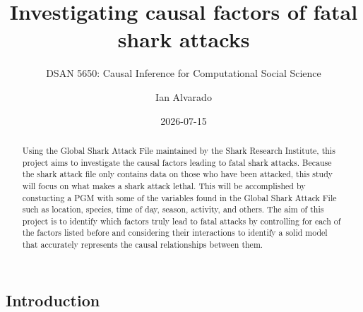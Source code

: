 \documentclass[
  letterpaper,
  DIV=11,
  numbers=noendperiod]{scrartcl}
\title{Investigating causal factors of fatal shark attacks}
\subtitle{DSAN 5650: Causal Inference for Computational Social Science}
\author{Ian Alvarado}
\date{2026-07-15}
\begin{document}
\maketitle
\begin{abstract}
Using the Global Shark Attack File maintained by the Shark Research
Institute, this project aims to investigate the causal factors leading
to fatal shark attacks. Because the shark attack file only contains data
on those who have been attacked, this study will focus on what makes a
shark attack lethal. This will be accomplished by constucting a PGM with
some of the variables found in the Global Shark Attack File such as
location, species, time of day, season, activity, and others. The aim of
this project is to identify which factors truly lead to fatal attacks by
controlling for each of the factors listed before and considering their
interactions to identify a solid model that accurately represents the
causal relationships between them.
\end{abstract}

\subsection{Introduction}\label{sec-1}
\end{document}

